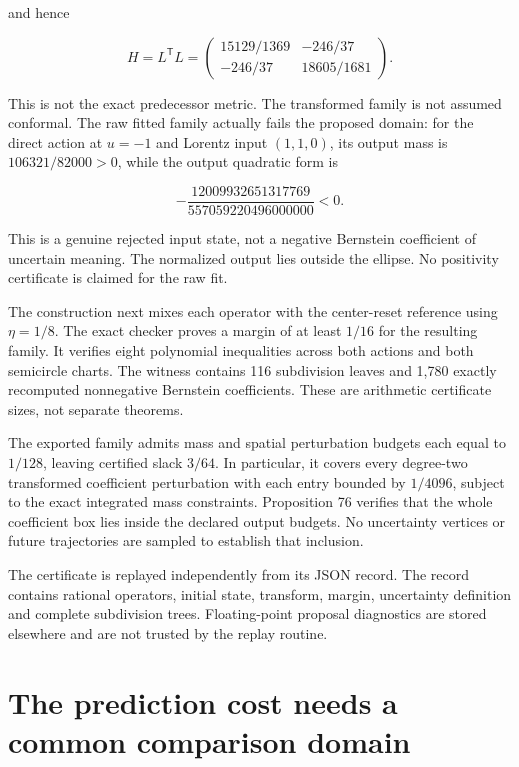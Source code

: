 and hence

\[
\boxed{
H=L^{\mathsf T}L=
\begin{pmatrix}15129/1369&-246/37\\-246/37&18605/1681\end{pmatrix}.
}
\]

This is not the exact predecessor metric. The transformed family is not
assumed conformal. The raw fitted family actually fails the proposed
domain: for the direct action at \(u=-1\) and Lorentz input \((1,1,0)\),
its output mass is \(106321/82000>0\), while the output quadratic form
is

\[
-\frac{12009932651317769}{557059220496000000}<0.
\]

This is a genuine rejected input state, not a negative Bernstein
coefficient of uncertain meaning. The normalized output lies outside the
ellipse. No positivity certificate is claimed for the raw fit.

The construction next mixes each operator with the center-reset
reference using \(\eta=1/8\). The exact checker proves a margin of at
least \(1/16\) for the resulting family. It verifies eight polynomial
inequalities across both actions and both semicircle charts. The witness
contains 116 subdivision leaves and 1,780 exactly recomputed nonnegative
Bernstein coefficients. These are arithmetic certificate sizes, not
separate theorems.

The exported family admits mass and spatial perturbation budgets each
equal to \(1/128\), leaving certified slack \(3/64\). In particular, it
covers every degree-two transformed coefficient perturbation with each
entry bounded by \(1/4096\), subject to the exact integrated mass
constraints. Proposition 76 verifies that the whole coefficient box lies
inside the declared output budgets. No uncertainty vertices or future
trajectories are sampled to establish that inclusion.

The certificate is replayed independently from its JSON record. The
record contains rational operators, initial state, transform, margin,
uncertainty definition and complete subdivision trees. Floating-point
proposal diagnostics are stored elsewhere and are not trusted by the
replay routine.

\section{The prediction cost needs a common comparison domain}\label{LSM:the-prediction-cost-needs-a-common-comparison-domain}

